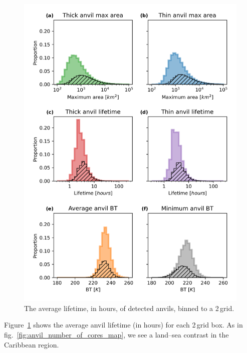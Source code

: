\begin{figure}[tp]
    \centering
    \includegraphics[width=\textwidth]{figures/chapter2_20.png}
    \caption[
    The average lifetime of detected anvils
    ]{
    The average lifetime, in hours, of detected anvils, binned to a 2\,\textdegree grid.
    }
    \label{fig:anvil_lifetime_map}
\end{figure}

Figure~\ref{fig:anvil_lifetime_map} shows the average anvil lifetime (in hours) for each 2\,\textdegree grid box.
As in fig.~\ref{fig:anvil_number_of_cores_map}, we see a land--sea contrast in the Caribbean region.


